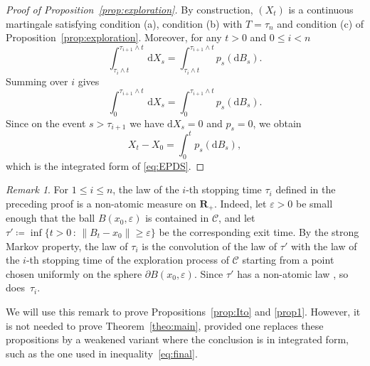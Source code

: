 \documentclass[12pt]{amsart}
\newcommand{\R}{\mathbf{R}}
\newcommand{\e}{\varepsilon}
\renewcommand{\leq}{\leqslant}
\renewcommand{\geq}{\geqslant}
\theoremstyle{plain}
\theoremstyle{remark}
\newtheorem{remark}{Remark}
\begin{document}
\begin{proof}[Proof of Proposition~\ref{prop:exploration}]
 By construction, $(X_t)$ is a continuous martingale satisfying condition (a), condition (b) with $T=\tau_n$ and condition (c) of Proposition~\ref{prop:exploration}. 
Moreover, for any $t>0$ and $0 \leq i < n$
\[ \int_{\tau_i \wedge t}^{\tau_{i+1} \wedge t} \, \mathrm{d}X_s = 
\int_{\tau_i \wedge t}^{\tau_{i+1} \wedge t} p_s(\mathrm{d}B_s).
\]
Summing over $i$ gives
\[ \int_{0}^{\tau_{i+1} \wedge t} \, \mathrm{d}X_s = 
\int_{0}^{\tau_{i+1} \wedge t} p_s(\mathrm{d}B_s).
\]
Since on the event $s> \tau_{i+1}$ we have $\mathrm{d}X_s =0$ and $p_s=0$, we obtain
\[ X_t - X_0 = \int_{0}^t p_s( \mathrm{d}B_s ) ,\]
which is the integrated form of \eqref{eq:EPDS}.
\end{proof}
 
\begin{remark} \label{rema:C1}
For $1 \leq i \leq n$, the law of the $i$-th stopping time $\tau_i$ defined in the preceding proof is a non-atomic measure on $\R_+$. Indeed, let $\e>0$ be small enough that the ball $B(x_0,\e)$ is contained in $\mathscr{C}$, and let $\tau' \coloneqq \inf \{ t>0 \, :\, \|B_t-x_0\| \geq \e \}$ be the corresponding exit time. By the strong Markov property, the law of $\tau_i$ is the convolution of the law of $\tau'$ with the law of the $i$-th stopping time of the exploration process of $\mathscr{C}$ starting from a point chosen uniformly on the sphere $\partial B(x_0,\e)$. Since $\tau'$ has a non-atomic law \cite{CT62}, so does~$\tau_i$.
 
We will use this remark to prove Propositions~\ref{prop:Ito} and \ref{prop1}. However, it is not needed to prove Theorem~\ref{theo:main}, provided one replaces these propositions by a weakened variant where the conclusion is in integrated form, such as the one used in inequality~\eqref{eq:final}.
\end{remark}
 
\end{document}
